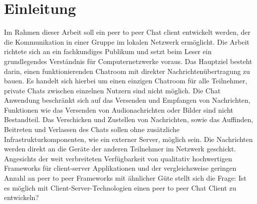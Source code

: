 \section{Einleitung}
Im Rahmen dieser Arbeit soll ein peer to peer Chat client entwickelt werden, der die Kommunikation in einer Gruppe im lokalen Netzwerk ermöglicht. 
Die Arbeit richtete sich an ein fachkundiges Publikum und setzt beim Leser ein grundlegendes Verständnis für Computernetzwerke voraus. 
Das Hauptziel besteht darin, einen funktionierenden Chatroom mit direkter Nachrichtenübertragung zu bauen.
Es handelt sich hierbei um einen einzigen Chatroom für alle Teilnehmer, private Chats zwischen einzelnen Nutzern sind nicht möglich. 
Die Chat Anwendung beschränkt sich auf das Versenden und Empfangen von Nachrichten, Funktionen wie das Versenden von Audionachrichten oder Bilder sind nicht Bestandteil. 
Das Verschicken und Zustellen von Nachrichten, sowie das Auffinden, Beitreten und Verlassen des Chats sollen ohne zusätzliche Infrastrukturkomponenten, wie ein externer Server, möglich sein.
Die Nachrichten werden direkt an die Geräte der anderen Teilnehmer im Netzwerk geschickt. 
Angesichts der weit verbreiteten Verfügbarkeit von qualitativ hochwertigen Frameworks für client-server Applikationen und der vergleichsweise geringen Anzahl an peer to peer Frameworks mit ähnlicher Güte stellt sich die Frage: 
Ist es möglich mit Client-Server-Technologien einen peer to peer Chat Client zu entwickeln?